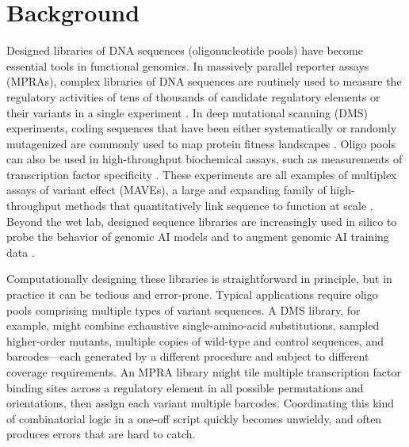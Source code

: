 \documentclass[pdflatex,sn-vancouver-num,referee,oneside]{sn-jnl}
\begin{document}
\modulolinenumbers[1]
\linenumbers
\maketitle

\section*{Background}\label{sec:background}

Designed libraries of DNA sequences (oligonucleotide pools) have become essential tools in functional genomics. In massively parallel reporter assays (MPRAs), complex libraries of DNA sequences are routinely used to measure the regulatory activities of tens of thousands of candidate regulatory elements or their variants in a single experiment \citep{Patwardhan2009cw, Kinney2010tn, Melnikov2012dw, Kwasnieski2012hu, Sharon2012io, Mogno2013cf, Levo2014hl, Inoue2015cs, Vvedenskaya2015ih, Urtecho2018hu, Klein2020, Romero2023, LaFleur2024aa}. In deep mutational scanning (DMS) experiments, coding sequences that have been either systematically or randomly mutagenized are commonly used to map protein fitness landscapes \citep{Fowler2010gt, Hietpas2011bp, Fowler2014gq, Olson2014iq, Adams2016dka, Findlay2018kd, Starr2020aa}. Oligo pools can also be used in high-throughput biochemical assays, such as measurements of transcription factor specificity \citep{Berger2006wp, Maerkl2007tv, Noyes2008vr, Gordan2013, Le2018cr, Shen2018ip, Khetan2025_paditseq}. These experiments are all examples of multiplex assays of variant effect (MAVEs), a large and expanding family of high-throughput methods that quantitatively link sequence to function at scale \citep{Kinney2019jc, Starita2017ec, Weile2018gm}. Beyond the wet lab, designed sequence libraries are increasingly used in silico to probe the behavior of genomic AI models \citep{Avsec2021bpnet, Toneyan2024creme, Seitz2024squid, Seitz2025, Nagai2026review} and to augment genomic AI training data \citep{Lee2023}.

Computationally designing these libraries is straightforward in principle, but in practice it can be tedious and error-prone. Typical applications require oligo pools comprising multiple types of variant sequences. A DMS library, for example, might combine exhaustive single-amino-acid substitutions, sampled higher-order mutants, multiple copies of wild-type and control sequences, and barcodes---each generated by a different procedure and subject to different coverage requirements. An MPRA library might tile multiple transcription factor binding sites across a regulatory element in all possible permutations and orientations, then assign each variant multiple barcodes. Coordinating this kind of combinatorial logic in a one-off script quickly becomes unwieldy, and often produces errors that are hard to catch.
\end{document}
